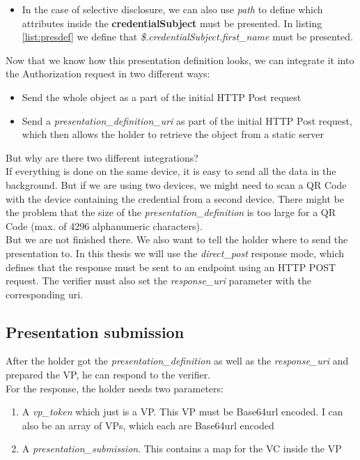 \documentclass[
	a4paper               %
	,BCOR=0mm            %
	,bibliography=totoc   %
	,listof=totoc         %
	,monolingual
	,twoside=false
]{bfhthesis}              %
\begin{document}
\begin{enumerate}
\begin{itemize}
\begin{itemize}
\begin{itemize}
				\item In the case of selective disclosure, we can also use \textit{path} to define which attributes inside the \textbf{credentialSubject} must be presented. In listing \ref{list:presdef} we define that \textit{\$.credentialSubject.first\_name} must be presented.
			\end{itemize}
		\end{itemize}
	\end{itemize}
\end{enumerate}

Now that we know how this presentation definition looks, we can integrate it into the Authorization request in two different ways:
\begin{itemize}
	\item Send the whole object as a part of the initial HTTP Post request
	\item Send a \textit{presentation\_definition\_uri} as part of the initial HTTP Post request, which then allows the holder to retrieve the object from a static server
\end{itemize}

But why are there two different integrations?\\
If everything is done on the same device, it is easy to send all the data in the background. But if we are using two devices, we might need to scan a QR Code with the device containing the credential from a second device. There might be the problem that the size of the \textit{presentation\_definition} is too large for a QR Code (max. of 4296 alphanumeric characters).\\

But we are not finished there. We also want to tell the holder where to send the presentation to.
In this thesis we will use the \textit{direct\_post} response mode, which defines that the response must be sent to an endpoint using an HTTP POST request. The verifier must also set the \textit{response\_uri} parameter with the corresponding uri.

\subsection{Presentation submission}
After the holder got the \textit{presentation\_definition} as well as the \textit{response\_uri} and prepared the VP, he can respond to the verifier.\\

For the response, the holder needs two parameters:
\begin{enumerate}
	\item A \textit{vp\_token} which just is a VP. This VP must be Base64url encoded. I can also be an array of VPs, which each are Base64url encoded
	\item A \textit{presentation\_submission}. This contains a map for the VC inside the VP
\end{enumerate}
\end{document}
